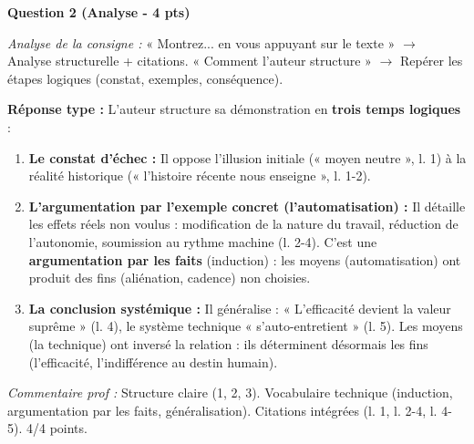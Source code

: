 \documentclass[11pt]{article}
\begin{document}
\begin{exoresolu}
\par\medskip\noindent\textbf{Question 2 (Analyse - 4 pts)}
\par\medskip
\emph{Analyse de la consigne :} « Montrez... en vous appuyant sur le texte » $\rightarrow$ Analyse structurelle + citations. « Comment l'auteur structure » $\rightarrow$ Repérer les étapes logiques (constat, exemples, conséquence).
\par\medskip
\textbf{Réponse type :}
L'auteur structure sa démonstration en \textbf{trois temps logiques} :
\begin{enumerate}
    \item \textbf{Le constat d'échec :} Il oppose l'illusion initiale (« moyen neutre », l. 1) à la réalité historique (« l'histoire récente nous enseigne », l. 1-2).
    \item \textbf{L'argumentation par l'exemple concret (l'automatisation) :} Il détaille les effets réels non voulus : modification de la nature du travail, réduction de l'autonomie, soumission au rythme machine (l. 2-4). C'est une \textbf{argumentation par les faits} (induction) : les moyens (automatisation) ont produit des fins (aliénation, cadence) non choisies.
    \item \textbf{La conclusion systémique :} Il généralise : « L'efficacité devient la valeur suprême » (l. 4), le système technique « s'auto-entretient » (l. 5). Les moyens (la technique) ont inversé la relation : ils déterminent désormais les fins (l'efficacité, l'indifférence au destin humain).
\end{enumerate}
\par\medskip
\emph{Commentaire prof :} Structure claire (1, 2, 3). Vocabulaire technique (induction, argumentation par les faits, généralisation). Citations intégrées (l. 1, l. 2-4, l. 4-5). 4/4 points.


\end{exoresolu}
\end{document}
